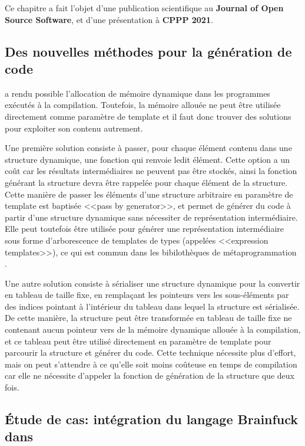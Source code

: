 \documentclass[main]{subfiles}
\begin{document}
Ce chapitre a fait l'objet d'une publication scientifique au
\textbf{Journal of Open Source Software}, et d'une pr\'esentation
\`a \textbf{CPPP 2021}.

\subsection*{
  Des nouvelles m\'ethodes pour la g\'en\'eration de code
}

 a rendu possible l'allocation de m\'emoire dynamique dans les programmes
\cpp ex\'ecut\'es \`a la compilation. Toutefois, la m\'emoire allou\'ee
ne peut \^etre utilis\'ee directement comme param\`etre de template et
il faut donc trouver des solutions pour exploiter son contenu autrement.

Une premi\`ere solution consiste \`a passer, pour chaque \'el\'ement contenu
dans une structure dynamique, une fonction qui renvoie ledit \'el\'ement.
Cette option a un co\^ut car les r\'esultats interm\'ediaires ne peuvent pas
\^etre stock\'es, ainsi la fonction g\'en\'erant la structure devra \^etre
rappel\'ee pour chaque \'el\'ement de la structure. Cette mani\`ere de passer
les \'el\'ements d'une structure arbitraire en param\`etre de template est
baptis\'ee <<pass by generator>>, et permet de g\'en\'erer du code \`a partir
d'une structure dynamique sans n\'ecessiter de repr\'esentation interm\'ediaire.
Elle peut toutefois \^etre utilis\'ee pour g\'en\'erer une repr\'esentation
interm\'ediaire sous forme d'arborescence de templates de types (appel\'ees
<<expression templates>>), ce qui est commun dans les bibiloth\`eques de
m\'etaprogrammation \cpp.

Une autre solution consiste \`a s\'erialiser une structure dynamique pour
la convertir en tableau de taille fixe, en rempla\c{c}ant les pointeurs vers
les sous-\'el\'ements par des indices pointant \`a l'int\'erieur du tableau
dans lequel la structure est s\'erialis\'ee. De cette mani\`ere, la structure
peut \^etre transform\'ee en tableau de taille fixe ne contenant aucun pointeur
vers de la m\'emoire dynamique allou\'ee \`a la compilation, et ce tableau
peut \^etre utilis\'e directement en param\`etre de template pour parcourir
la structure et g\'en\'erer du code.
Cette technique n\'ecessite plus d'effort, mais on peut s'attendre \`a
ce qu'elle soit moins co\^uteuse en temps de compilation car elle ne n\'ecessite
d'appeler la fonction de g\'en\'eration de la structure que deux fois.

\subsection*{
  \'Etude de cas: int\'egration du langage Brainfuck dans \cpp
}
\end{document}

